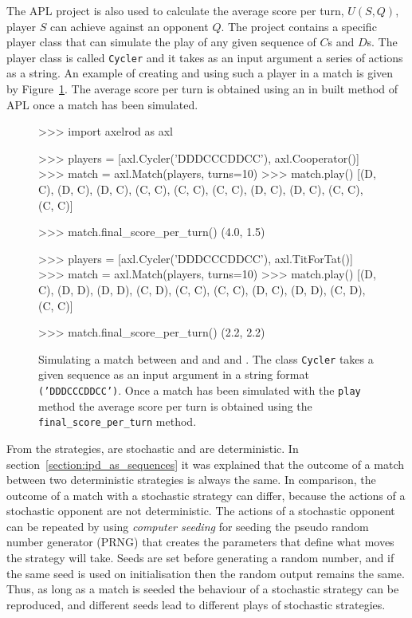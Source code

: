 The APL project is also used to calculate the average score per turn, \(U(S, Q)\),
player \(S\) can achieve against an opponent \(Q\). The project contains a specific
player
class that can simulate the play of any given sequence of $C$s and $D$s. The player class
is called \texttt{Cycler} and it takes as an input argument a series of actions as a
string.
An example of creating and using such a player in a match is given by
Figure~\ref{fig:apl_simulations_cycler}. The average score per turn is obtained
using an in built method of APL once a match has been simulated.

\begin{figure}[!htbp]
    \begin{usagepy}
>>> import axelrod as axl

>>> players = [axl.Cycler('DDDCCCDDCC'), axl.Cooperator()]
>>> match = axl.Match(players, turns=10)
>>> match.play()
[(D, C), (D, C), (D, C), (C, C), (C, C), (C, C), (D, C), (D, C), (C, C), (C, C)]

>>> match.final_score_per_turn()
(4.0, 1.5)

>>> players = [axl.Cycler('DDDCCCDDCC'), axl.TitForTat()]
>>> match = axl.Match(players, turns=10)
>>> match.play()
[(D, C), (D, D), (D, D), (C, D), (C, C), (C, C), (D, C), (D, D), (C, D), (C, C)]

>>> match.final_score_per_turn()
(2.2, 2.2)

\end{usagepy}
\caption{Simulating a match between \Cycler and \Cooperator and \Cycler and \TitForTat.
The class \texttt{Cycler} takes a given sequence as an input argument in a string format
\texttt{('DDDCCCDDCC')}. Once a match has been simulated with the \texttt{play} method
the average score per turn is obtained using the \texttt{final_score_per_turn}
method.}\label{fig:apl_simulations_cycler}
\end{figure}

From the \numberofstrategiesbestsequences strategies, \stochasticstrategies are stochastic and
\deterministicstrategies are deterministic. In section~\ref{section:ipd_as_sequences} it was explained
that the outcome of a match between two deterministic strategies is always the same.
In comparison, the outcome of a match with a stochastic strategy can
differ, because the actions of a stochastic opponent are not deterministic.
The actions of a stochastic opponent can be repeated by using
\textit{computer seeding} for seeding the pseudo random number generator (PRNG) that creates the
parameters that define what moves the strategy will take. Seeds are set before
generating a random number, and if the same seed is used on initialisation then
the random output remains the same. Thus, as long as a match is seeded the
behaviour of a stochastic strategy can be reproduced, and different seeds lead
to different plays of stochastic strategies.

